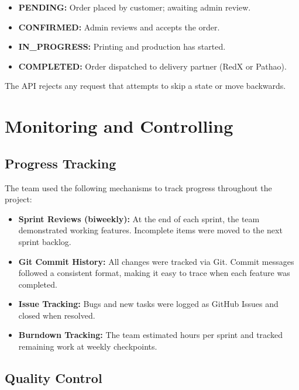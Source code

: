 \documentclass[12pt,a4paper]{report}
\begin{document}
\begin{itemize}
  \item \textbf{PENDING:} Order placed by customer; awaiting admin review.
  \item \textbf{CONFIRMED:} Admin reviews and accepts the order.
  \item \textbf{IN\_PROGRESS:} Printing and production has started.
  \item \textbf{COMPLETED:} Order dispatched to delivery partner (RedX or Pathao).
\end{itemize}

The API rejects any request that attempts to skip a state or move backwards.

\chapter{Monitoring and Controlling}

\section{Progress Tracking}

The team used the following mechanisms to track progress throughout the project:

\begin{itemize}
  \item \textbf{Sprint Reviews (biweekly):} At the end of each sprint, the team demonstrated working features. Incomplete items were moved to the next sprint backlog.
  \item \textbf{Git Commit History:} All changes were tracked via Git. Commit messages followed a consistent format, making it easy to trace when each feature was completed.
  \item \textbf{Issue Tracking:} Bugs and new tasks were logged as GitHub Issues and closed when resolved.
  \item \textbf{Burndown Tracking:} The team estimated hours per sprint and tracked remaining work at weekly checkpoints.
\end{itemize}

\section{Quality Control}
\end{document}

